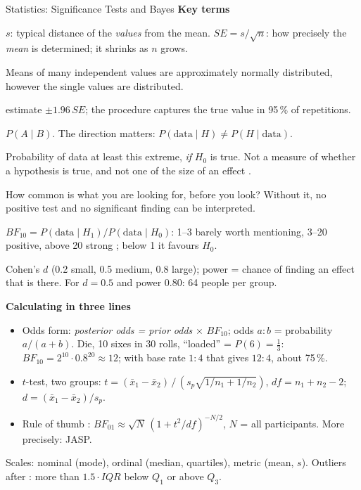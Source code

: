 \begin{handout}{Statistics: Significance Tests and Bayes}
\textbf{Key terms}
\begin{description}\itemsep 0pt
  \item[Standard deviation, standard error] $s$: typical distance of the
    \emph{values} from the mean. $\mathit{SE}=s/\sqrt{n}$: how precisely
    the \emph{mean} is determined; it shrinks as $n$ grows.
  \item[Central limit theorem] Means of many independent values are
    approximately normally distributed, however the single values are
    distributed.
  \item[Confidence interval] estimate $\pm1.96\,\mathit{SE}$; the
    procedure captures the true value in 95\,\% of repetitions.
  \item[Conditional probability] $P(A\mid B)$. The direction matters:
    $P(\text{data}\mid H)\neq P(H\mid\text{data})$.
  \item[p-value] Probability of data at least this extreme, \emph{if}
    $H_0$ is true. Not a measure of whether a hypothesis is true, and not
    one of the size of an effect \parencite{wassersteinlazar2016asa}.
  \item[Base rate] How common is what you are looking for, before you
    look? Without it, no positive test and no significant finding can be
    interpreted.
  \item[Bayes factor] $\mathit{BF}_{10}=P(\text{data}\mid H_1)/P(\text{data}\mid H_0)$:
    1--3 barely worth mentioning, 3--20 positive, above 20 strong
    \parencite{kassraftery1995}; below 1 it favours $H_0$.
  \item[Effect size, power] Cohen's $d$ (0.2 small, 0.5 medium, 0.8
    large); power = chance of finding an effect that is there. For
    $d=0.5$ and power 0.80: 64 people per group.
\end{description}

\textbf{Calculating in three lines}
\begin{itemize}\itemsep 0pt
  \item Odds form: \emph{posterior odds = prior odds} $\times$
    $\mathit{BF}_{10}$; odds $a:b$ = probability $a/(a+b)$.
    Die, 10 sixes in 30 rolls, \enquote{loaded} = $P(6)=\tfrac13$:
    $\mathit{BF}_{10}=2^{10}\cdot0.8^{20}\approx12$; with base rate $1:4$
    that gives $12:4$, about 75\,\%.
  \item $t$-test, two groups: $t=(\bar{x}_1-\bar{x}_2)\,/\,(s_p\sqrt{1/n_1+1/n_2})$,
    $\mathit{df}=n_1+n_2-2$; $d=(\bar{x}_1-\bar{x}_2)/s_p$.
  \item Rule of thumb \parencite{wagenmakers2007practical}:
    $\mathit{BF}_{01}\approx\sqrt{N}\,(1+t^2/\mathit{df})^{-N/2}$, $N$ = all
    participants. More precisely: JASP.
\end{itemize}
Scales: nominal (mode), ordinal (median, quartiles), metric (mean, $s$).
Outliers after \textcite{tukey1977eda}: more than
$1.5\cdot\mathit{IQR}$ below $Q_1$ or above $Q_3$.


\end{handout}
